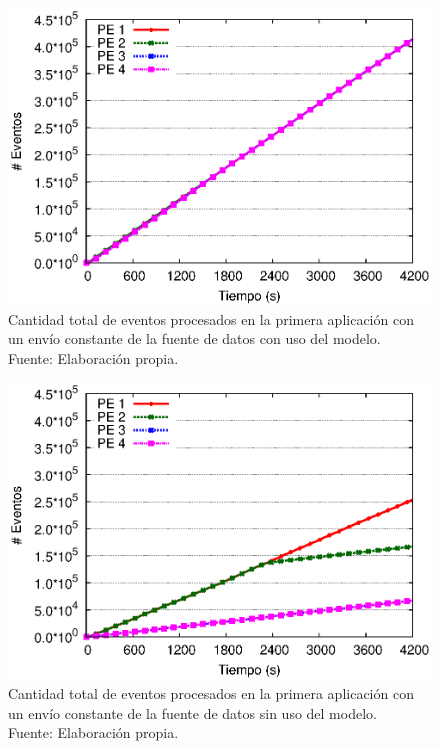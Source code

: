 \begin{figure}[!ht]
	\centering
	\captionsetup{justification=centering}
    \includegraphics[scale=0.7]{images/exp/app1/uniform/cm/eventCount.eps}
    \caption[Cantidad total de eventos procesados en la primera aplicaci\'on con un env\'io constante de la fuente de datos con uso del modelo.]{Cantidad total de eventos procesados en la primera aplicaci\'on con un env\'io constante de la fuente de datos con uso del modelo.\\Fuente: Elaboraci\'on propia.}
    \label{fig:app1-uniform-eventCount-cm}
\end{figure}

\begin{figure}[!ht]
	\centering
	\captionsetup{justification=centering}
    \includegraphics[scale=0.7]{images/exp/app1/uniform/sm/eventCount.eps}
    \caption[Cantidad total de eventos procesados en la primera aplicaci\'on con un env\'io constante de la fuente de datos sin uso del modelo.]{Cantidad total de eventos procesados en la primera aplicaci\'on con un env\'io constante de la fuente de datos sin uso del modelo.\\Fuente: Elaboraci\'on propia.}
    \label{fig:app1-uniform-eventCount-sm}
\end{figure}

